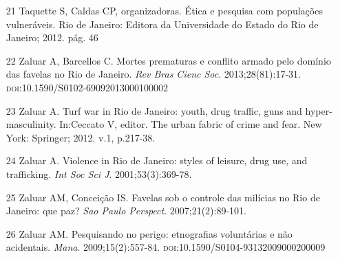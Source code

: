 \documentclass{article}
\begin{document}
\begin{itemize}
\item[21] Taquette S, Caldas CP, organizadoras. Ética e pesquisa com populações
vulneráveis. Rio de Janeiro: Editora da Universidade do Estado do Rio de
Janeiro; 2012. pág. 46

\item[22] Zaluar A, Barcellos C. Mortes prematuras e conflito armado pelo
domínio das favelas no Rio de Janeiro. \textit{Rev Bras Cienc Soc}. 2013;28(81):17-31. \textsc{doi}:10.1590/S0102-69092013000100002

\item[23] Zaluar A. Turf war in Rio de Janeiro: youth, drug traffic, guns and
hyper-masculinity. In:Ceccato V, editor. The urban fabric of crime and fear. New
York: Springer; 2012. v.1, p.217-38.

\item[24] Zaluar A. Violence in Rio de Janeiro: styles of leisure, drug use, and
trafficking. \textit{Int Soc Sci J}. 2001;53(3):369-78.

\item[25] Zaluar AM, Conceição IS. Favelas sob o controle das milícias no Rio de
Janeiro: que paz? \textit{Sao Paulo Perspect}. 2007;21(2):89-101.

\item[26] Zaluar AM. Pesquisando no perigo: etnografias voluntárias e não
acidentais. \textit{Mana}. 2009;15(2):557-84. \textsc{doi}:10.1590/S0104-93132009000200009

\end{itemize}
\end{document}
